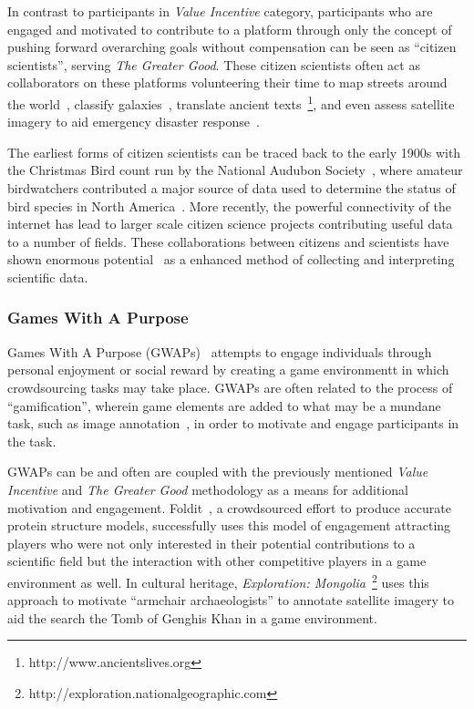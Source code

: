 \documentclass[10pt,twocolumn]{article}
\begin{document}
In contrast to participants in \textit{Value Incentive} category, 
participants who are engaged and motivated to contribute to a platform through 
only the concept of pushing forward overarching goals without compensation 
can be seen as ``citizen scientists'', serving \textit{The Greater Good}. These 
citizen scientists often act as collaborators on these platforms volunteering 
their time to map streets around the world~\cite{Haklay}, classify 
galaxies~\cite{Lintott2008}, translate ancient 
texts~\footnote{http://www.ancientslives.org}, and even assess satellite 
imagery to aid emergency disaster response~\cite{Barrington2012,Goodchild2010}.

The earliest forms of citizen scientists can be traced back to the early 1900s 
with the Christmas Bird count run by the National Audubon 
Society~\cite{Silvertown2009}, where amateur birdwatchers contributed a major 
source of data used to determine the status of bird species in North 
America~\cite{Butcher1990}. More recently, the powerful connectivity of the 
internet has lead to larger scale citizen science projects contributing 
useful data to a number of fields. These collaborations between citizens 
and scientists have shown enormous potential~\cite{Newman2012} as a enhanced
method of collecting and interpreting scientific data.

\subsubsection*{Games With A Purpose}

Games With A Purpose (GWAPs)~\cite{VonAhn2008} attempts to engage individuals
through personal enjoyment or social reward by creating a game environmentt
in which crowdsourcing tasks may take place. GWAPs are often related to the 
process of ``gamification'', wherein game elements are added to what may be 
a mundane task, such as image annotation~\cite{VonAhn2004}, in order to motivate 
and engage participants in the task.


GWAPs can be and often are coupled with the previously mentioned \textit{Value 
Incentive} and \textit{The Greater Good} methodology as a means for additional 
motivation and engagement. Foldit~\cite{Cooper2010}, a crowdsourced effort to 
produce accurate protein structure models, successfully uses this model of
engagement attracting players who were not only interested in their potential
contributions to a scientific field but the interaction with other competitive
players in a game environment as well. In cultural heritage, \textit{Exploration:
Mongolia}~\footnote{http://exploration.nationalgeographic.com} uses this approach
to motivate ``armchair archaeologists'' to annotate satellite imagery to aid
the search the Tomb of Genghis Khan in a game environment.
\end{document}
